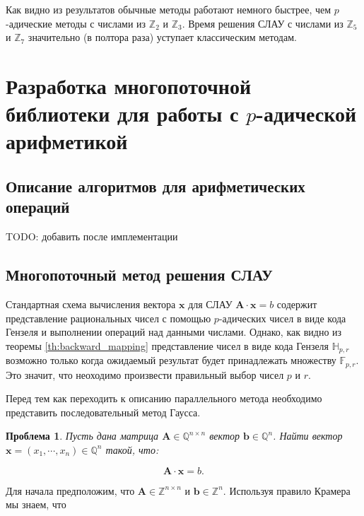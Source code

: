 \documentclass[master, och, diploma, times]{sty/SCWorks}
\theoremstyle{plain}
\newtheorem{problem}{Проблема}[section]
\theoremstyle{definition}
\begin{document}
 Как видно из результатов обычные методы работают немного быстрее, чем $p$-адические методы с числами из $\mathbb{Z}_2$ и $\mathbb{Z}_3$. Время решения СЛАУ с числами из $\mathbb{Z}_5$ и $\mathbb{Z}_7$ значительно (в полтора раза) уступает классическим методам.
 
\section{Разработка многопоточной библиотеки для работы с $p$-адической арифметикой}

\subsection{Описание алгоритмов для арифметических операций}
TODO: добавить после имплементации

\subsection{Многопоточный метод решения СЛАУ}
Стандартная схема вычисления вектора $\boldsymbol{x}$ для СЛАУ $\boldsymbol{A}\cdot \boldsymbol{x} = b$ содержит представление рациональных чисел с помощью $p$-адических чисел в виде кода Гензеля и выполнении операций над данными числами. Однако, как видно из теоремы \ref{th:backward_mapping} представление чисел в виде кода Гензеля $\mathbb{H}_{p,r}$ возможно только когда ожидаемый результат будет принадлежать множеству $\mathbb{F}_{p,r}$. Это значит, что неоходимо произвести правильный выбор чисел $p$ и $r$.


Перед тем как переходить к описанию параллельного метода необходимо представить последовательный метод Гаусса.

\begin{problem}
Пусть дана матрица $\boldsymbol{A} \in \mathbb{Q}^{n \times n}$ вектор $\boldsymbol{b} \in \mathbb{Q}^{n}$. Найти вектор $\boldsymbol{x}=(x_1,\cdots,x_n) \in \mathbb{Q}^{n}$ такой, что:

\begin{equation}
\boldsymbol{A}\cdot \boldsymbol{x} = b.
\end{equation}

\end{problem}

Для начала предположим, что $\boldsymbol{A} \in \mathbb{Z}^{n \times n}$ и $\boldsymbol{b} \in \mathbb{Z}^{n}$. Используя правило Крамера мы знаем, что 
\end{document}
